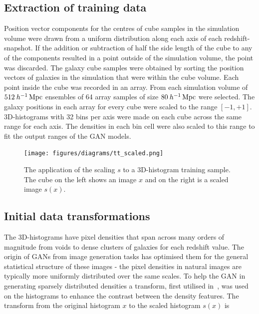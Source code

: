 \documentclass[twocolumn]{article}
\numberwithin{equation}{section}
\begin{document}

\subsection{Extraction of training data} %
Position vector components for the centres of cube samples in the simulation volume were drawn from a uniform distribution along each axis of each redshift-snapshot. If the addition or subtraction of half the side length of the cube to any of the components resulted in a point outside of the simulation volume, the point was discarded. The galaxy cube samples were obtained by sorting the position vectors of galaxies in the simulation that were within the cube volume. Each point inside the cube was recorded in an array. From each simulation volume of $512 \: h^{-1} \,\textup{Mpc}$ ensembles of 64 array samples of size $80 \: h^{-1} \,\textup{Mpc}$ were selected. The galaxy positions in each array for every cube were scaled to the range $[-1,+1]$. 3D-histograms with 32 bins per axis were made on each cube across the same range for each axis. The densities in each bin cell were also scaled to this range to fit the output ranges of the GAN models. 

\begin{figure}
\texttt{[image: figures/diagrams/tt\_scaled.png]}%
\centering
\caption{The application of the scaling $s$ to a 3D-histogram training sample. The cube on the left shows an image $x$ and on the right is a scaled image $s(x)$.}
\label{fig:scaling}
\end{figure}

\subsection{Initial data transformations} 
The 3D-histograms have pixel densities that span across many orders of magnitude from voids to dense clusters of galaxies for each redshift value. The origin of GANs from image generation tasks has optimised them for the general statistical structure of these images - the pixel densities in natural images are typically more uniformly distributed over the same scales. To help the GAN in generating sparsely distributed densities a transform, first utilised in~\cite{web_gan}, was used on the histograms to enhance the contrast between the density features. The transform from the original histogram $x$ to the scaled histogram $s(x)$ is 
\end{document}
